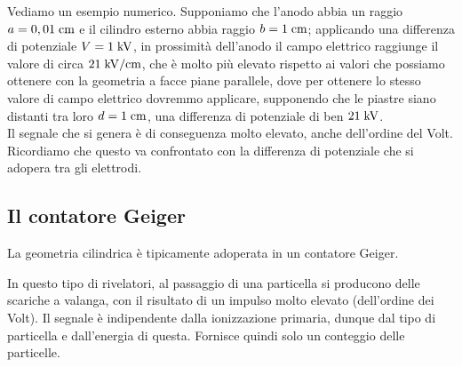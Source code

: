 \begin{esempio}
   Vediamo un esempio numerico. Supponiamo che l'anodo abbia un raggio $a=0,01 \; \rm cm$ e il cilindro esterno abbia raggio $b=1 \; \rm cm$; applicando una differenza di potenziale $V=1 \; \rm kV$, in prossimità dell'anodo il campo elettrico raggiunge il valore di circa $21 \; \rm kV/cm$, che è molto più elevato rispetto ai valori che possiamo ottenere con la geometria a facce piane parallele, dove per ottenere lo stesso valore di campo elettrico dovremmo applicare, supponendo che le piastre siano distanti tra loro $d=1 \; \rm cm$, una differenza di potenziale di ben $21 \; \rm kV$.\\
   Il segnale che si genera è di conseguenza molto elevato, anche dell'ordine del Volt. Ricordiamo che questo va confrontato con la differenza di potenziale che si adopera tra gli elettrodi.
\end{esempio}

\subsection{Il contatore Geiger}

La geometria cilindrica è tipicamente adoperata in un contatore Geiger.

In questo tipo di rivelatori, al passaggio di una particella si producono delle scariche a valanga, con il risultato di un impulso molto elevato (dell'ordine dei Volt). Il segnale è indipendente dalla ionizzazione primaria, dunque dal tipo di particella e dall'energia di questa. Fornisce quindi solo un conteggio delle particelle.

